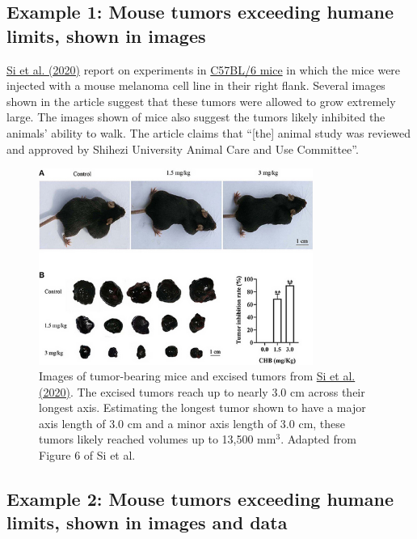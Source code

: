 \documentclass[letterpaper, 12pt]{article}
\begin{document}
\subsection*{Example 1: Mouse tumors exceeding humane limits, shown in images}

\href{https://doi.org/10.3389/fonc.2020.00415}{Si et al. (2020)} report on experiments in \href{https://en.wikipedia.org/wiki/C57BL/6}{C57BL/6 mice} in which the mice were injected with a mouse melanoma cell line in their right flank. Several images shown in the article suggest that these tumors were allowed to grow extremely large. The images shown of mice also suggest the tumors likely inhibited the animals' ability to walk. The article claims that ``[the] animal study was reviewed and approved by Shihezi University Animal Care and Use Committee''.

\begin{figure}[h!tbp]
    \centering
    \includegraphics[width=0.8\textwidth]{img/tumor_burden/Screenshot 2025-04-04 at 15-23-31 fonc-10-00415-g006.png}
    \caption*{Images of tumor-bearing mice and excised tumors from \href{https://doi.org/10.3389/fonc.2020.00415}{Si et al. (2020)}. The excised tumors reach up to nearly 3.0 cm across their longest axis. Estimating the longest tumor shown to have a major axis length of 3.0 cm and a minor axis length of 3.0 cm, these tumors likely reached volumes up to 13,500 mm$^3$. Adapted from Figure 6 of Si et al.}
\end{figure}

\pagebreak

\subsection*{Example 2: Mouse tumors exceeding humane limits, shown in images and data}
\end{document}
